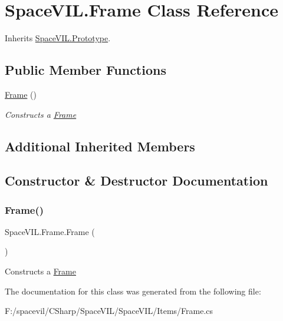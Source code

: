 \hypertarget{class_space_v_i_l_1_1_frame}{}\section{Space\+V\+I\+L.\+Frame Class Reference}
\label{class_space_v_i_l_1_1_frame}


Inherits \mbox{\hyperlink{class_space_v_i_l_1_1_prototype}{Space\+V\+I\+L.\+Prototype}}.

\subsection*{Public Member Functions}
\begin{DoxyCompactItemize}
\item 
\mbox{\hyperlink{class_space_v_i_l_1_1_frame_a637421f7d67b16e11064a78867a386db}{Frame}} ()
\begin{DoxyCompactList}\small\item\em Constructs a \mbox{\hyperlink{class_space_v_i_l_1_1_frame}{Frame}} \end{DoxyCompactList}\end{DoxyCompactItemize}
\subsection*{Additional Inherited Members}


\subsection{Constructor \& Destructor Documentation}
\mbox{\label{class_space_v_i_l_1_1_frame_a637421f7d67b16e11064a78867a386db}} 
\subsubsection{\texorpdfstring{Frame()}{Frame()}}
{\footnotesize\ttfamily Space\+V\+I\+L.\+Frame.\+Frame (\begin{DoxyParamCaption}{ }\end{DoxyParamCaption})}



Constructs a \mbox{\hyperlink{class_space_v_i_l_1_1_frame}{Frame}} 



The documentation for this class was generated from the following file\+:\begin{DoxyCompactItemize}
\item 
F\+:/spacevil/\+C\+Sharp/\+Space\+V\+I\+L/\+Space\+V\+I\+L/\+Items/Frame.\+cs\end{DoxyCompactItemize}
